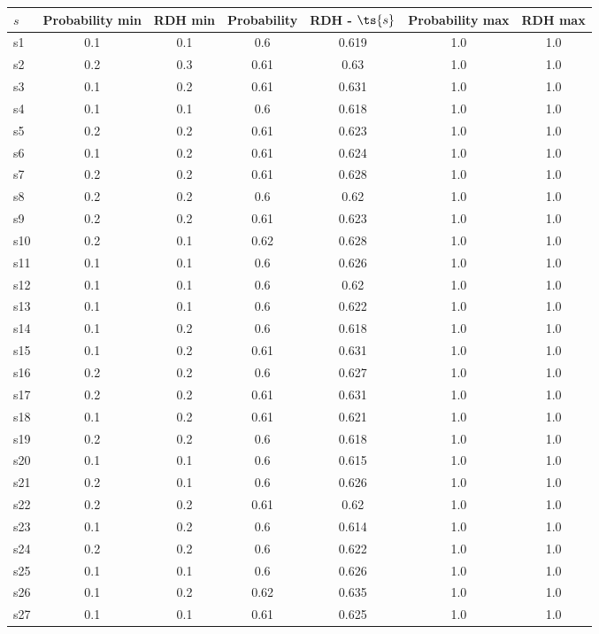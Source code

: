 \documentclass{article}
\begin{document}
\noindent\begin{tabular}{|l|c|c|c|c|c|c|}
\hline
$s$& Probability min & RDH min & Probability & RDH - $\ts{s}$ & Probability max & RDH max\\
\hline
s1 &0.1 & 0.1 & 0.6 & 0.619 & 1.0 & 1.0\\
\hline
s2 &0.2 & 0.3 & 0.61 & 0.63 & 1.0 & 1.0\\
\hline
s3 &0.1 & 0.2 & 0.61 & 0.631 & 1.0 & 1.0\\
\hline
s4 &0.1 & 0.1 & 0.6 & 0.618 & 1.0 & 1.0\\
\hline
s5 &0.2 & 0.2 & 0.61 & 0.623 & 1.0 & 1.0\\
\hline
s6 &0.1 & 0.2 & 0.61 & 0.624 & 1.0 & 1.0\\
\hline
s7 &0.2 & 0.2 & 0.61 & 0.628 & 1.0 & 1.0\\
\hline
s8 &0.2 & 0.2 & 0.6 & 0.62 & 1.0 & 1.0\\
\hline
s9 &0.2 & 0.2 & 0.61 & 0.623 & 1.0 & 1.0\\
\hline
s10 &0.2 & 0.1 & 0.62 & 0.628 & 1.0 & 1.0\\
\hline
s11 &0.1 & 0.1 & 0.6 & 0.626 & 1.0 & 1.0\\
\hline
s12 &0.1 & 0.1 & 0.6 & 0.62 & 1.0 & 1.0\\
\hline
s13 &0.1 & 0.1 & 0.6 & 0.622 & 1.0 & 1.0\\
\hline
s14 &0.1 & 0.2 & 0.6 & 0.618 & 1.0 & 1.0\\
\hline
s15 &0.1 & 0.2 & 0.61 & 0.631 & 1.0 & 1.0\\
\hline
s16 &0.2 & 0.2 & 0.6 & 0.627 & 1.0 & 1.0\\
\hline
s17 &0.2 & 0.2 & 0.61 & 0.631 & 1.0 & 1.0\\
\hline
s18 &0.1 & 0.2 & 0.61 & 0.621 & 1.0 & 1.0\\
\hline
s19 &0.2 & 0.2 & 0.6 & 0.618 & 1.0 & 1.0\\
\hline
s20 &0.1 & 0.1 & 0.6 & 0.615 & 1.0 & 1.0\\
\hline
s21 &0.2 & 0.1 & 0.6 & 0.626 & 1.0 & 1.0\\
\hline
s22 &0.2 & 0.2 & 0.61 & 0.62 & 1.0 & 1.0\\
\hline
s23 &0.1 & 0.2 & 0.6 & 0.614 & 1.0 & 1.0\\
\hline
s24 &0.2 & 0.2 & 0.6 & 0.622 & 1.0 & 1.0\\
\hline
s25 &0.1 & 0.1 & 0.6 & 0.626 & 1.0 & 1.0\\
\hline
s26 &0.1 & 0.2 & 0.62 & 0.635 & 1.0 & 1.0\\
\hline
s27 &0.1 & 0.1 & 0.61 & 0.625 & 1.0 & 1.0\\

\end{tabular}
\end{document}
